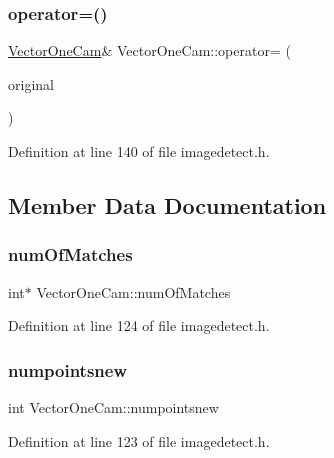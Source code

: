 \subsubsection{\texorpdfstring{operator=()}{operator=()}}
{\footnotesize\ttfamily \mbox{\hyperlink{struct_vector_one_cam}{Vector\+One\+Cam}}\& Vector\+One\+Cam\+::operator= (\begin{DoxyParamCaption}\item[{const \mbox{\hyperlink{struct_vector_one_cam}{Vector\+One\+Cam}} \&}]{original }\end{DoxyParamCaption})\hspace{0.3cm}{\ttfamily [inline]}}



Definition at line 140 of file imagedetect.\+h.



\subsection{Member Data Documentation}
\mbox{\label{struct_vector_one_cam_a7878ff51411b0436ed942d686e0cf98f}} 
\subsubsection{\texorpdfstring{numOfMatches}{numOfMatches}}
{\footnotesize\ttfamily int$\ast$ Vector\+One\+Cam\+::num\+Of\+Matches}



Definition at line 124 of file imagedetect.\+h.

\mbox{\label{struct_vector_one_cam_a501707a86a9927a08fdc8ff7a60f20b6}} 
\subsubsection{\texorpdfstring{numpointsnew}{numpointsnew}}
{\footnotesize\ttfamily int Vector\+One\+Cam\+::numpointsnew}



Definition at line 123 of file imagedetect.\+h.

\mbox{\label{struct_vector_one_cam_abf5305db443c509558f2be958f484705}} 
